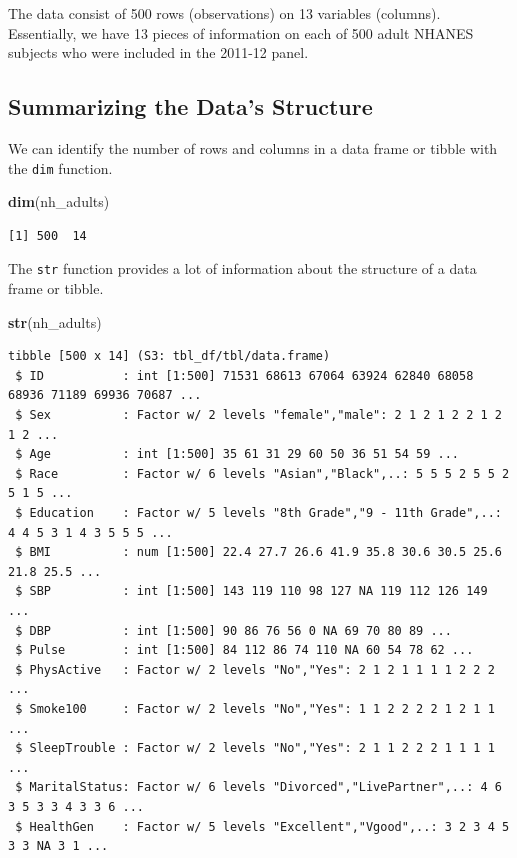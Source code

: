 \documentclass[
]{book}
\newenvironment{Shaded}{\begin{snugshade}}{\end{snugshade}}
\newcommand{\KeywordTok}[1]{\textcolor[rgb]{0.13,0.29,0.53}{\textbf{#1}}}
\newcommand{\NormalTok}[1]{#1}
\begin{document}
The data consist of 500 rows (observations) on 13 variables (columns). Essentially, we have 13 pieces of information on each of 500 adult NHANES subjects who were included in the 2011-12 panel.

\hypertarget{summarizing-the-datas-structure}{%
\subsection{Summarizing the Data's Structure}\label{summarizing-the-datas-structure}}

We can identify the number of rows and columns in a data frame or tibble with the \texttt{dim} function.

\begin{Shaded}
\begin{Highlighting}[]
\KeywordTok{dim}\NormalTok{(nh_adults)}
\end{Highlighting}
\end{Shaded}

\begin{verbatim}
[1] 500  14
\end{verbatim}

The \texttt{str} function provides a lot of information about the structure of a data frame or tibble.

\begin{Shaded}
\begin{Highlighting}[]
\KeywordTok{str}\NormalTok{(nh_adults)}
\end{Highlighting}
\end{Shaded}

\begin{verbatim}
tibble [500 x 14] (S3: tbl_df/tbl/data.frame)
 $ ID           : int [1:500] 71531 68613 67064 63924 62840 68058 68936 71189 69936 70687 ...
 $ Sex          : Factor w/ 2 levels "female","male": 2 1 2 1 2 2 1 2 1 2 ...
 $ Age          : int [1:500] 35 61 31 29 60 50 36 51 54 59 ...
 $ Race         : Factor w/ 6 levels "Asian","Black",..: 5 5 5 2 5 5 2 5 1 5 ...
 $ Education    : Factor w/ 5 levels "8th Grade","9 - 11th Grade",..: 4 4 5 3 1 4 3 5 5 5 ...
 $ BMI          : num [1:500] 22.4 27.7 26.6 41.9 35.8 30.6 30.5 25.6 21.8 25.5 ...
 $ SBP          : int [1:500] 143 119 110 98 127 NA 119 112 126 149 ...
 $ DBP          : int [1:500] 90 86 76 56 0 NA 69 70 80 89 ...
 $ Pulse        : int [1:500] 84 112 86 74 110 NA 60 54 78 62 ...
 $ PhysActive   : Factor w/ 2 levels "No","Yes": 2 1 2 1 1 1 1 2 2 2 ...
 $ Smoke100     : Factor w/ 2 levels "No","Yes": 1 1 2 2 2 2 1 2 1 1 ...
 $ SleepTrouble : Factor w/ 2 levels "No","Yes": 2 1 1 2 2 2 1 1 1 1 ...
 $ MaritalStatus: Factor w/ 6 levels "Divorced","LivePartner",..: 4 6 3 5 3 3 4 3 3 6 ...
 $ HealthGen    : Factor w/ 5 levels "Excellent","Vgood",..: 3 2 3 4 5 3 3 NA 3 1 ...
\end{verbatim}
\end{document}
